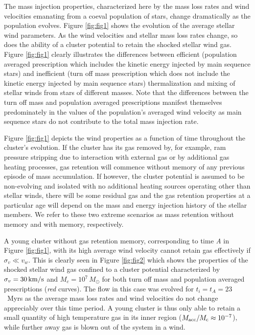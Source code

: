 \documentclass[fleqn,usenatbib]{mnras}
\begin{document}
The  mass injection properties, characterized here by the mass loss rates and wind velocities emanating from a coeval population of stars,  change dramatically  
as the population evolves.   Figure \ref{fig:fig1} shows the evolution of the average stellar wind parameters.  As the 
wind velocities and stellar mass loss rates change, so does the ability of a cluster potential 
to retain the shocked stellar wind  gas.  
 Figure \ref{fig:fig1} clearly illustrates  the differences  between efficient  (population averaged prescription which includes the kinetic energy injected by main sequence stars) and inefficient (turn off mass prescription which does not include the kinetic energy injected by main sequence stars) thermalization and mixing of stellar winds from stars of different masses. Note that the differences between the turn off mass and population averaged prescriptions manifest themselves  
predominately in the values of the population's averaged wind velocity as  main sequence stars do not contribute  to the total mass injection rate.

Figure \ref{fig:fig1} depicts the  wind properties as a function of time throughout the cluster's evolution.  If the cluster has its gas removed by, for example,  ram pressure stripping due to  interaction with external gas \citep{priestley2011} or by additional gas heating processes,  gas retention will commence without memory of  any previous episode of mass accumulation. If however, the cluster potential  is assumed to be non-evolving and isolated with no additional heating sources operating  other than 
stellar winds, there will be some residual gas and the gas retention properties at a particular age will depend on the mass and energy  injection history of the stellar members. We refer to these two extreme  scenarios as mass retention without memory and with memory, respectively.

A young cluster without gas retention memory, corresponding to time {\it A} in  Figure \ref{fig:fig1}, with its high average wind velocity  
cannot retain gas effectively if  $\sigma_v\ll v_w$.  This is clearly seen  in Figure \ref{fig:fig2} which  shows the  properties of the shocked stellar wind gas confined to a cluster potential characterized by  $\sigma_v = 30 \, {\rm km/s}$ and $M_c = 10^7 \, M_\odot$ for both turn off mass and population averaged  prescriptions ({\it red} curves). The flow in this case was evolved for $t_i=t_A=23$~Myrs as the average mass loss rates and wind velocities do not change appreciably over this time period.  A young cluster  is thus only able to retain a small quantity of  high temperature gas in its inner  region ($M_{\rm acc}/M_{\rm c} \approx 10^{-7}$), while further away gas is blown out of the system in a wind. 
\end{document}
